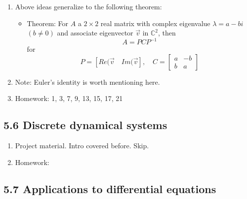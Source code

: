 \documentclass{article}
\begin{document}
\begin{enumerate}
\item Above ideas generalize to the following theorem:
\begin{itemize}
\item Theorem: For $A$ a $2 \times 2$ real matrix with complex eigenvalue $\lambda = a-bi$ $(b \neq 0)$ and associate eigenvector $\vec{v}$ in $\mathbb{C}^2$, then
\[
A = P C P^{-1}
\]
for
\[
P = [ Re(\vec{v} \quad Im(\vec{v} ], \quad C = \left[
\begin{array}{cc}
a & -b \\
b & a
\end{array}
\right]
\]
\end{itemize}

\item Note: Euler's identity is worth mentioning here.  

\item Homework: 1, 3, 7, 9, 13, 15, 17, 21

\end{enumerate}

\subsection{5.6 Discrete dynamical systems}

\begin{enumerate}

\item Project material. Intro covered before. Skip.

\item Homework: 

\end{enumerate}

\subsection{5.7 Applications to differential equations}
\end{document}
